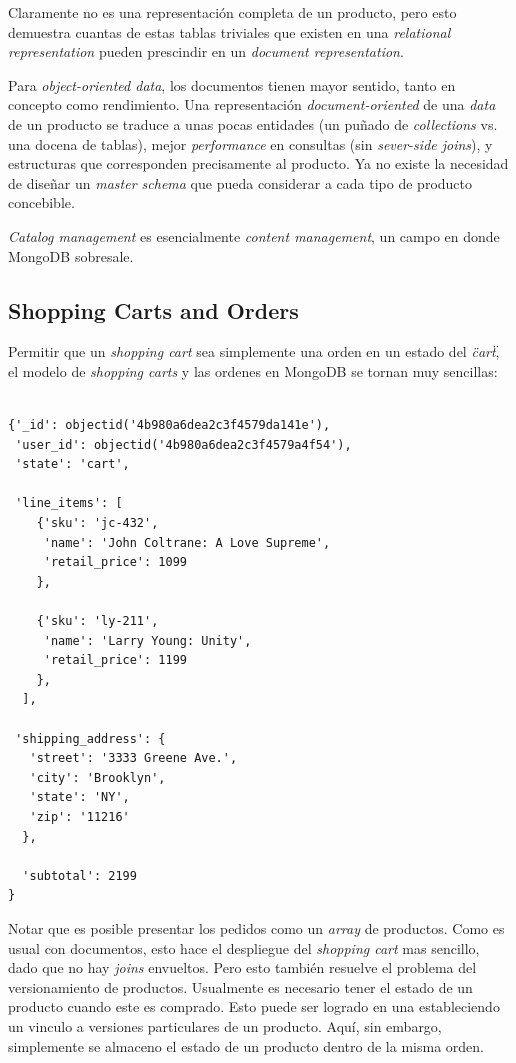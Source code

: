 Claramente no es una representación completa de un producto, pero esto demuestra cuantas de estas tablas triviales que existen en una \textit{relational representation} pueden prescindir en un \textit{document representation}.

Para \textit{object-oriented data}, los documentos tienen mayor sentido, tanto en concepto como rendimiento. Una representación \textit{document-oriented} de una \textit{data} de un producto se traduce a unas pocas entidades (un puñado de \textit{collections} vs. una docena de tablas), mejor \textit{performance} en consultas (sin \textit{sever-side joins}), y estructuras que corresponden precisamente al producto. Ya no existe la necesidad de diseñar un \textit{master schema} que pueda considerar a cada tipo de producto concebible.

\textit{Catalog management} es esencialmente \textit{content management}, un campo en donde MongoDB sobresale.

\subsection{Shopping Carts and Orders}

Permitir que un \textit{shopping cart} sea simplemente una orden en un estado del \textit{\"cart\"}, el modelo de \textit{shopping carts} y las ordenes en MongoDB se tornan muy sencillas:

\medskip
\begin{lstlisting}[caption= Estructura de una orden.]

{'_id': objectid('4b980a6dea2c3f4579da141e'),
 'user_id': objectid('4b980a6dea2c3f4579a4f54'),
 'state': 'cart',

 'line_items': [
    {'sku': 'jc-432',
     'name': 'John Coltrane: A Love Supreme',
     'retail_price': 1099
    },

    {'sku': 'ly-211',
     'name': 'Larry Young: Unity',
     'retail_price': 1199
    },
  ],

 'shipping_address': {
   'street': '3333 Greene Ave.',
   'city': 'Brooklyn',
   'state': 'NY',
   'zip': '11216'
  },

  'subtotal': 2199
}
\end{lstlisting}

Notar que es posible presentar los pedidos como un \textit{array} de productos. Como es usual con documentos, esto hace el despliegue del \textit{shopping cart} mas sencillo, dado que no hay \textit{joins} envueltos. Pero esto también resuelve el problema del versionamiento de productos. Usualmente es necesario tener el estado de un producto cuando este es comprado. Esto puede ser logrado en una  estableciendo un vinculo a versiones particulares de un producto. Aquí, sin embargo, simplemente se almaceno el estado de un producto dentro de la misma orden.


